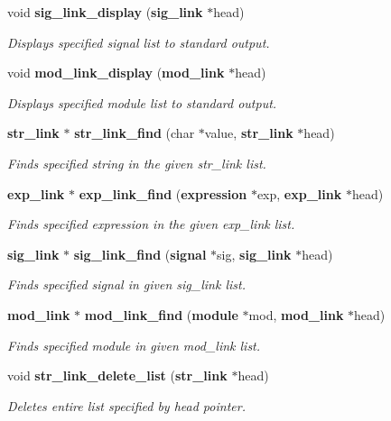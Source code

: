 \begin{CompactItemize}
void {\bf sig\_\-link\_\-display} ({\bf sig\_\-link} $\ast$head)
\begin{CompactList}\small\item\em Displays specified signal list to standard output.\item\end{CompactList}\item 
void {\bf mod\_\-link\_\-display} ({\bf mod\_\-link} $\ast$head)
\begin{CompactList}\small\item\em Displays specified module list to standard output.\item\end{CompactList}\item 
{\bf str\_\-link} $\ast$ {\bf str\_\-link\_\-find} (char $\ast$value, {\bf str\_\-link} $\ast$head)
\begin{CompactList}\small\item\em Finds specified string in the given str\_\-link list.\item\end{CompactList}\item 
{\bf exp\_\-link} $\ast$ {\bf exp\_\-link\_\-find} ({\bf expression} $\ast$exp, {\bf exp\_\-link} $\ast$head)
\begin{CompactList}\small\item\em Finds specified expression in the given exp\_\-link list.\item\end{CompactList}\item 
{\bf sig\_\-link} $\ast$ {\bf sig\_\-link\_\-find} ({\bf signal} $\ast$sig, {\bf sig\_\-link} $\ast$head)
\begin{CompactList}\small\item\em Finds specified signal in given sig\_\-link list.\item\end{CompactList}\item 
{\bf mod\_\-link} $\ast$ {\bf mod\_\-link\_\-find} ({\bf module} $\ast$mod, {\bf mod\_\-link} $\ast$head)
\begin{CompactList}\small\item\em Finds specified module in given mod\_\-link list.\item\end{CompactList}\item 
void {\bf str\_\-link\_\-delete\_\-list} ({\bf str\_\-link} $\ast$head)
\begin{CompactList}\small\item\em Deletes entire list specified by head pointer.\item\end{CompactList}\item 

\end{CompactItemize}
